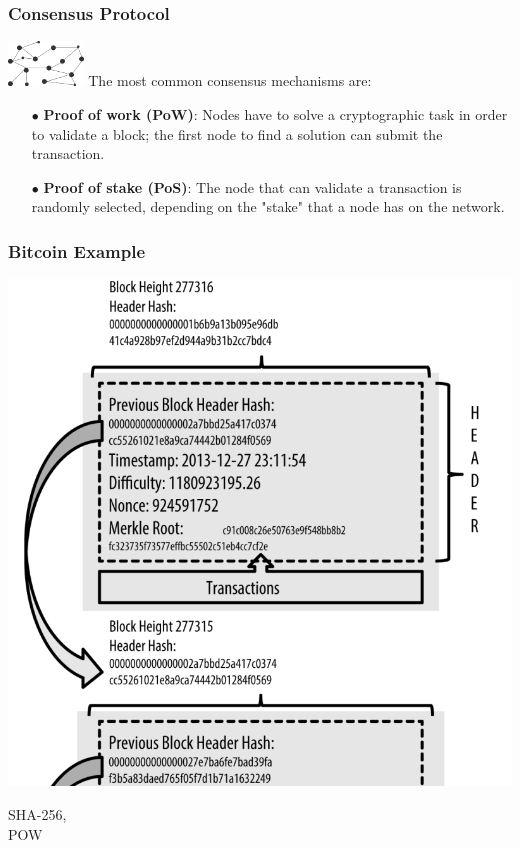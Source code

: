 \documentclass{beamer}
\begin{document}
\begin{frame}
	\frametitle{Consensus Protocol}
	\includegraphics[width=0.15\textwidth,right]{bc}
	The most common consensus mechanisms are:\linebreak
	\begin{itemize}
		\item[$\bullet$] \textbf{Proof of work (PoW)}: Nodes have to solve a cryptographic task in order to
		validate a block; the first node to find a solution can submit the transaction.
		\linebreak
		\item[$\bullet$] \textbf{Proof of stake (PoS)}: The node that can validate a transaction is randomly
		selected, depending on the "stake" that a node has on the network.
	\end{itemize}	
	
\end{frame}

\begin{frame}
\frametitle{Bitcoin Example}

\noindent\begin{minipage}{0.6\textwidth}%
	\includegraphics[width=\linewidth]{btcblocks}
\end{minipage}%
\begin{minipage}{0.3\textwidth}\raggedleft
	SHA-256,\\
	POW
\end{minipage}

\end{frame}
\end{document}
